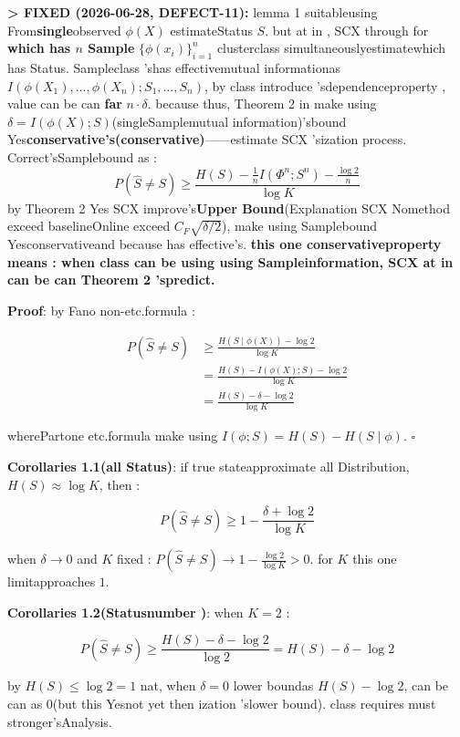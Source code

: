 \documentclass[
  12pt,
]{article}
\begin{document}
\textbf{\textgreater{} FIXED (2026-06-28, DEFECT-11):} lemma  1
suitableusing From\textbf{single}observed \(\phi(X)\) estimateStatus \(S\). but at in , SCX
through for  \textbf{which has  \(n\) Sample} \(\{\phi(x_i)\}_{i=1}^n\)
clusterclass simultaneouslyestimatewhich has Status. Sampleclass 'shas effectivemutual informationas 
\(I(\phi(X_1),\ldots,\phi(X_n); S_1,\ldots,S_n)\), by class introduce 'sdependenceproperty , value can be can \textbf{far}
\(n \cdot \delta\). because thus, Theorem 2 in make using 
\(\delta = I(\phi(X); S)\)(singleSamplemutual information)'sbound Yes\textbf{conservative's(conservative)}------estimate
SCX 'sization process. Correct'sSamplebound as : 
\[P(\hat{S} \neq S) \geq \frac{H(S) - \frac{1}{n}I(\Phi^n; S^n) - \frac{\log 2}{n}}{\log K}\]
by  Theorem 2 Yes SCX improve's\textbf{Upper Bound}(Explanation SCX Nomethod exceed baselineOnline exceed
\(C_F\sqrt{\delta/2}\)), make using Samplebound Yesconservativeand because has effective's. \textbf{this one conservativeproperty means : when class can be using using Sampleinformation, SCX
at in can be can  Theorem 2 'spredict. }

\textbf{Proof}: by  Fano non-etc.formula : 

\[\begin{aligned}
P(\hat{S} \neq S) &\geq \frac{H(S \mid \phi(X)) - \log 2}{\log K} \\
&= \frac{H(S) - I(\phi(X); S) - \log 2}{\log K} \\
&= \frac{H(S) - \delta - \log 2}{\log K}
\end{aligned}\]

wherePartone etc.formula make using  \(I(\phi; S) = H(S) - H(S \mid \phi)\). \(\square\)

\textbf{Corollaries
1.1(all Status)}: if true stateapproximate all Distribution, \(H(S) \approx \log K\), then : 

\[P(\hat{S} \neq S) \geq 1 - \frac{\delta + \log 2}{\log K}\]

when  \(\delta \to 0\) and  \(K\)
fixed : \(P(\hat{S} \neq S) \to 1 - \frac{\log 2}{\log K} > 0\). for 
\(K\) this one limitapproaches \(1\). 

\textbf{Corollaries 1.2(Statusnumber )}: when  \(K = 2\) : 

\[P(\hat{S} \neq S) \geq \frac{H(S) - \delta - \log 2}{\log 2} = H(S) - \delta - \log 2\]

by  \(H(S) \leq \log 2 = 1\) nat, when  \(\delta = 0\) lower boundas 
\(H(S) - \log 2\), can be can as 
\(0\)(but this Yesnot yet then ization 'slower bound). class requires must stronger'sAnalysis. 
\end{document}
